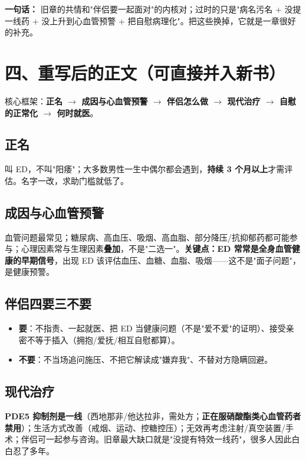 \vspace{0.5em}
\noindent\textbf{一句话：} 旧章的共情和"伴侣要一起面对"的内核对；过时的只是"病名污名 + 没提一线药 + 没上升到心血管预警 + 把自慰病理化"。把这些换掉，它就是一章很好的补充。

\section{四、重写后的正文（可直接并入新书）}

核心框架：\textbf{正名 $\rightarrow$ 成因与心血管预警 $\rightarrow$ 伴侣怎么做 $\rightarrow$ 现代治疗 $\rightarrow$ 自慰的正常化 $\rightarrow$ 何时就医}。

\subsection*{正名}
叫 ED，不叫"阳痿"；大多数男性一生中偶尔都会遇到，\textbf{持续 3 个月以上}才需评估。名字一改，求助门槛就低了。

\subsection*{成因与心血管预警}
血管问题最常见；糖尿病、高血压、吸烟、高血脂、部分降压/抗抑郁药都可能参与；心理因素常与生理因素\textbf{叠加}，不是"二选一"。\textbf{关键点：ED 常常是全身血管健康的早期信号}，出现 ED 该评估血压、血糖、血脂、吸烟——这不是"面子问题"，是健康预警。

\subsection*{伴侣四要三不要}
\begin{itemize}
  \item \textbf{要}：不指责、一起就医、把 ED 当健康问题（不是"爱不爱"的证明）、接受亲密不等于插入（拥抱/爱抚/相互自慰都算）。
  \item \textbf{不要}：不当场追问施压、不把它解读成"嫌弃我"、不替对方隐瞒回避。
\end{itemize}

\subsection*{现代治疗}
\textbf{PDE5 抑制剂是一线}（西地那非/他达拉非，需处方；\textbf{正在服硝酸酯类心血管药者禁用}）；生活方式改善（戒烟、运动、控糖控压）；无效再考虑注射/真空装置/手术；伴侣可一起参与咨询。旧章最大缺口就是"没提有特效一线药"，很多人因此白白忍了多年。

